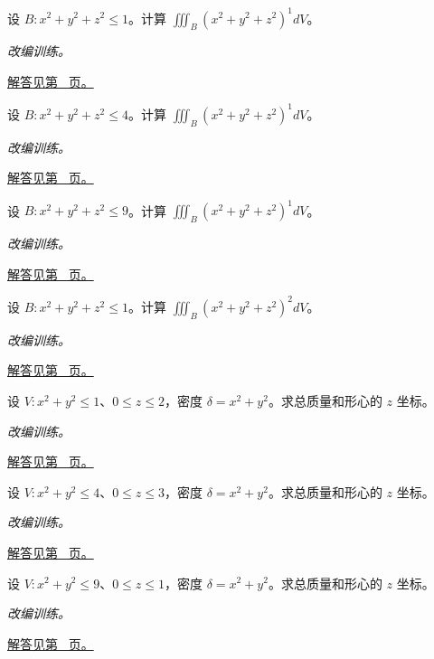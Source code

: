 \documentclass[12pt,fontset=fandol]{ctexart}
\begin{document}
\begin{example}[球内的径向积分]\label{ex:c38q15}
设 $B:x^2+y^2+z^2\le 1$。计算 $\displaystyle\iiint_B(x^2+y^2+z^2)^{1}dV$。
\par\textit{改编训练。}\par\hyperref[ans:c38q15]{解答见第~\pageref{ans:c38q15} 页。}
\end{example}
\begin{example}[球内的径向积分]\label{ex:c38q16}
设 $B:x^2+y^2+z^2\le 4$。计算 $\displaystyle\iiint_B(x^2+y^2+z^2)^{1}dV$。
\par\textit{改编训练。}\par\hyperref[ans:c38q16]{解答见第~\pageref{ans:c38q16} 页。}
\end{example}
\begin{example}[球内的径向积分]\label{ex:c38q17}
设 $B:x^2+y^2+z^2\le 9$。计算 $\displaystyle\iiint_B(x^2+y^2+z^2)^{1}dV$。
\par\textit{改编训练。}\par\hyperref[ans:c38q17]{解答见第~\pageref{ans:c38q17} 页。}
\end{example}
\begin{example}[球内的径向积分]\label{ex:c38q18}
设 $B:x^2+y^2+z^2\le 1$。计算 $\displaystyle\iiint_B(x^2+y^2+z^2)^{2}dV$。
\par\textit{改编训练。}\par\hyperref[ans:c38q18]{解答见第~\pageref{ans:c38q18} 页。}
\end{example}
\begin{example}[圆柱体内的径向质量]\label{ex:c38q19}
设 $V:x^2+y^2\le 1$、$0\le z\le 2$，密度 $\delta=x^2+y^2$。求总质量和形心的 $z$ 坐标。
\par\textit{改编训练。}\par\hyperref[ans:c38q19]{解答见第~\pageref{ans:c38q19} 页。}
\end{example}
\begin{example}[圆柱体内的径向质量]\label{ex:c38q20}
设 $V:x^2+y^2\le 4$、$0\le z\le 3$，密度 $\delta=x^2+y^2$。求总质量和形心的 $z$ 坐标。
\par\textit{改编训练。}\par\hyperref[ans:c38q20]{解答见第~\pageref{ans:c38q20} 页。}
\end{example}
\begin{example}[圆柱体内的径向质量]\label{ex:c38q21}
设 $V:x^2+y^2\le 9$、$0\le z\le 1$，密度 $\delta=x^2+y^2$。求总质量和形心的 $z$ 坐标。
\par\textit{改编训练。}\par\hyperref[ans:c38q21]{解答见第~\pageref{ans:c38q21} 页。}
\end{example}
\end{document}
